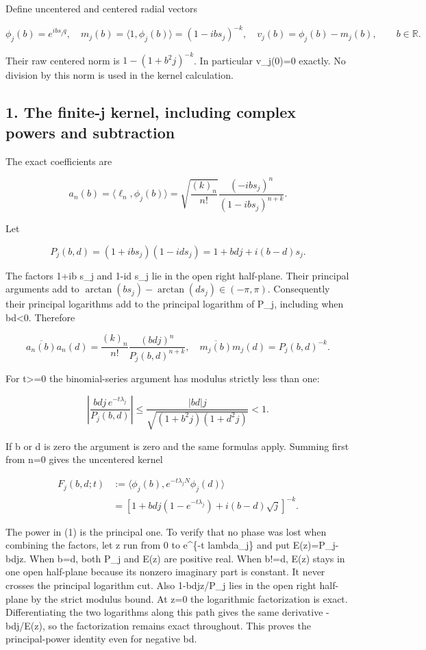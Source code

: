 \documentclass[
  11pt,
]{article}
\begin{document}
Define uncentered and centered radial vectors

\[
 \phi_j(b)=e^{ib s_jq},\quad
 m_j(b)=\langle1,\phi_j(b)\rangle=(1-ib s_j)^{-k},\quad
 v_j(b)=\phi_j(b)-m_j(b),\qquad b\in\mathbb R.
\]

Their raw centered norm is \(1-(1+b^2j)^{-k}\). In particular v\_j(0)=0
exactly. No division by this norm is used in the kernel calculation.

\subsection{1. The finite-j kernel, including complex powers and
subtraction}\label{weak-coupling-part-5-the-finite-j-kernel-including-complex-powers-and-subtraction}

The exact coefficients are

\[
 a_n(b)=\langle\ell_n,\phi_j(b)\rangle
 =\sqrt{\frac{(k)_n}{n!}}
       \frac{(-ib s_j)^n}{(1-ib s_j)^{n+k}}.
\]

Let

\[
 P_j(b,d)=(1+ib s_j)(1-id s_j)
          =1+bdj+i(b-d)s_j.
\]

The factors 1+ib s\_j and 1-id s\_j lie in the open right half-plane.
Their principal arguments add to
\(\arctan(bs_j)-\arctan(ds_j)\in(-\pi,\pi)\). Consequently their
principal logarithms add to the principal logarithm of P\_j, including
when bd\textless0. Therefore

\[
 \overline{a_n(b)}a_n(d)
 =\frac{(k)_n}{n!}\frac{(bdj)^n}{P_j(b,d)^{n+k}},
 \quad
 \overline{m_j(b)}m_j(d)=P_j(b,d)^{-k}.
\]

For t\textgreater=0 the binomial-series argument has modulus strictly
less than one:

\[
 \left|\frac{bdj\,e^{-t\lambda_j}}{P_j(b,d)}\right|
 \le\frac{|bd|j}{\sqrt{(1+b^2j)(1+d^2j)}}<1.
\]

If b or d is zero the argument is zero and the same formulas apply.
Summing first from n=0 gives the uncentered kernel

\[
 \begin{split}
 F_j(b,d;t)
 &:=\langle\phi_j(b),e^{-t\lambda_jN}\phi_j(d)\rangle\\
 &=\left[1+bdj(1-e^{-t\lambda_j})+i(b-d)\sqrt j\right]^{-k}.
 \tag{1}
 \end{split}
\]

The power in (1) is the principal one. To verify that no phase was lost
when combining the factors, let z run from 0 to e\^{}\{-t lambda\_j\}
and put E(z)=P\_j-bdjz. When b=d, both P\_j and E(z) are positive real.
When b!=d, E(z) stays in one open half-plane because its nonzero
imaginary part is constant. It never crosses the principal logarithm
cut. Also 1-bdjz/P\_j lies in the open right half-plane by the strict
modulus bound. At z=0 the logarithmic factorization is exact.
Differentiating the two logarithms along this path gives the same
derivative -bdj/E(z), so the factorization remains exact throughout.
This proves the principal-power identity even for negative bd.
\end{document}
